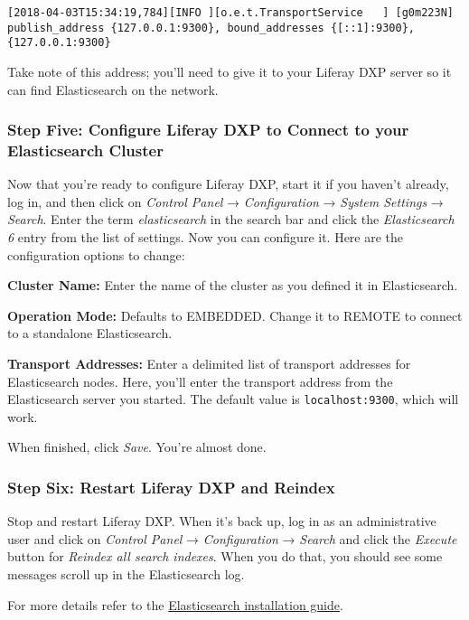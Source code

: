 \begin{verbatim}
[2018-04-03T15:34:19,784][INFO ][o.e.t.TransportService   ] [g0m223N] publish_address {127.0.0.1:9300}, bound_addresses {[::1]:9300}, {127.0.0.1:9300}
\end{verbatim}

Take note of this address; you'll need to give it to your Liferay DXP
server so it can find Elasticsearch on the network.

\subsubsection{Step Five: Configure Liferay DXP to Connect to your
Elasticsearch
Cluster}\label{step-five-configure-liferay-dxp-to-connect-to-your-elasticsearch-cluster}

Now that you're ready to configure Liferay DXP, start it if you haven't
already, log in, and then click on \emph{Control Panel} →
\emph{Configuration} → \emph{System Settings} → \emph{Search}. Enter the
term \emph{elasticsearch} in the search bar and click the
\emph{Elasticsearch 6} entry from the list of settings. Now you can
configure it. Here are the configuration options to change:

\textbf{Cluster Name:} Enter the name of the cluster as you defined it
in Elasticsearch.

\textbf{Operation Mode:} Defaults to EMBEDDED. Change it to REMOTE to
connect to a standalone Elasticsearch.

\textbf{Transport Addresses:} Enter a delimited list of transport
addresses for Elasticsearch nodes. Here, you'll enter the transport
address from the Elasticsearch server you started. The default value is
\texttt{localhost:9300}, which will work.

When finished, click \emph{Save}. You're almost done.

\subsubsection{Step Six: Restart Liferay DXP and
Reindex}\label{step-six-restart-liferay-dxp-and-reindex}

Stop and restart Liferay DXP. When it's back up, log in as an
administrative user and click on \emph{Control Panel} →
\emph{Configuration} → \emph{Search} and click the \emph{Execute} button
for \emph{Reindex all search indexes}. When you do that, you should see
some messages scroll up in the Elasticsearch log.

For more details refer to the
\href{https://www.elastic.co/guide/en/elasticsearch/reference/6.x/getting-started-install.html}{Elasticsearch
installation guide}.

